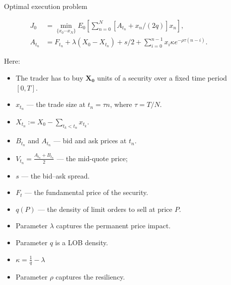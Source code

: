\documentclass[]{beamer}
\begin{document}
\begin{frame}[t]
\begin{columns}[t]
\begin{column}{\onecolwid}
\begin{block}{Optimal execution problem}
        
        \begin{align*} \label{oEproblem}
           J_0 &= \min _{\{x_0 \cdots x_N \}} E_0 \left[ \sum _{n=0}^N [A_{t_n} + x_n /(2q)] x_n\right],  \\
           A_{t_n} &= F_{t_n} + \lambda (X_0 - X_{t_n}) + s/2 + \sum _{i=0}^{n-1} x_i \kappa e^{- \rho \tau (n - i)}.
        \end{align*}
        
       Here:
       \begin{itemize}
        \item The trader has to buy $\mathbf{X_0}$ units of a security over a ﬁxed time period $[0,T]$. 
        \item $x_{t_n}$ 
        --- the trade size at $t_n = \tau n$, where $\tau = T / N$. 
        \item $X_{t_n} := X_0 - \sum _{t_k < t_n} x_{t_k}$. 
        \item $B_{t_n}$ and $A_{t_n}$ --- bid and ask prices at $t_n$. 
        \item $V_{t_n} = \frac{A_{t_n} + B_{t_n}}{2}$ 
        --- the mid-quote price; 
        \item $s$ --- the bid–ask spread.
        \item $F_t$ --- the fundamental price of the security.
        \item $q(P)$ --- the density of limit orders to sell at price $P$.
        \item Parameter $\lambda$ captures the permanent price impact.
        \item Parameter $q$ is a LOB density. 
         \item $\kappa = \frac{1}{q} - \lambda $
        \item Parameter $\rho$ captures the resiliency.

       \end{itemize}
        \end{block}

    
    
    \end{column} 
    \begin{column}{\sepwid}\end{column} %
    
    \begin{column}{\onecolwid} %


\end{column}
\end{columns}
\end{frame}
\end{document}

